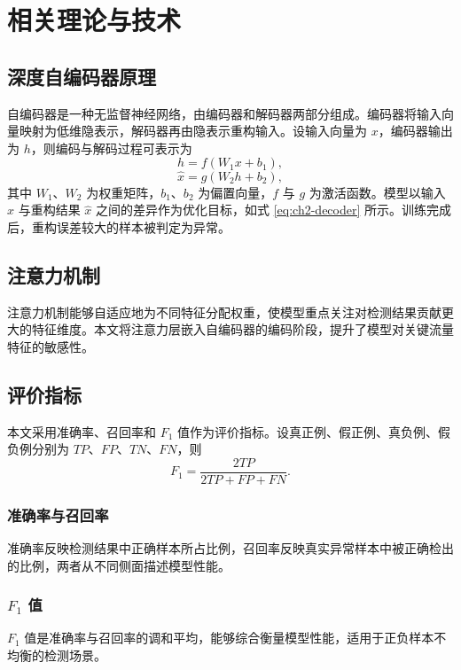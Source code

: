 \chapter{相关理论与技术}

\section{深度自编码器原理}

自编码器是一种无监督神经网络，由编码器和解码器两部分组成。编码器将输入向量映射为低维隐表示，解码器再由隐表示重构输入。设输入向量为 $x$，编码器输出为 $h$，则编码与解码过程可表示为
\begin{equation}
  h = f(W_1 x + b_1),
  \label{eq:ch2-encoder}
\end{equation}
\begin{equation}
  \hat{x} = g(W_2 h + b_2),
  \label{eq:ch2-decoder}
\end{equation}
其中 $W_1$、$W_2$ 为权重矩阵，$b_1$、$b_2$ 为偏置向量，$f$ 与 $g$ 为激活函数。模型以输入 $x$ 与重构结果 $\hat{x}$ 之间的差异作为优化目标，如式 \eqref{eq:ch2-decoder} 所示。训练完成后，重构误差较大的样本被判定为异常。

\section{注意力机制}

注意力机制能够自适应地为不同特征分配权重，使模型重点关注对检测结果贡献更大的特征维度。本文将注意力层嵌入自编码器的编码阶段，提升了模型对关键流量特征的敏感性。

\section{评价指标}

本文采用准确率、召回率和 $F_1$ 值作为评价指标。设真正例、假正例、真负例、假负例分别为 $TP$、$FP$、$TN$、$FN$，则
\begin{equation}
  F_1 = \frac{2TP}{2TP + FP + FN}.
  \label{eq:ch2-f1}
\end{equation}

\subsection{准确率与召回率}

准确率反映检测结果中正确样本所占比例，召回率反映真实异常样本中被正确检出的比例，两者从不同侧面描述模型性能。

\subsection{$F_1$ 值}

$F_1$ 值是准确率与召回率的调和平均，能够综合衡量模型性能，适用于正负样本不均衡的检测场景。
